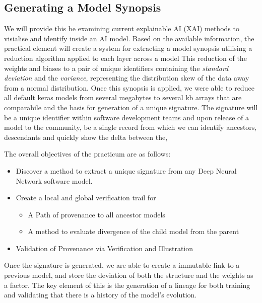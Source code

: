 \subsection{Generating a Model Synopsis}
We will provide this be examining current explainable AI (XAI) methods to visialise and identify inside an AI model. Based on the available information, the practical element will create a system for extracting a model synopsis utilising a reduction algorithm applied to each layer across a model This reduction of the weights and biases to a pair of unique identifiers containing the \textit{standard deviation} and the \textit{variance}, representing the distribution skew of the data away from a normal distribution. Once this synopsis is applied, we were able to reduce all default keras models from several megabytes to several kb arrays that are comparabile and the basis for generation of a unique signature. The signature will be a unique identifier within software development teams and upon release of a model to the community, be a single record from which we can identify ancestors, descendants and quickly show the delta between the,

The overall objectives of the practicum are as follows:

\begin{itemize}
    \item Discover a method to extract a unique signature from any Deep Neural Network software model.
    \item Create a local and global verification trail for
    \begin{itemize}
        \item A Path of provenance to all ancestor models
        \item A method to evaluate divergence of the child model from the parent
    \end{itemize}
    \item Validation of Provenance via Verification and Illustration
\end{itemize}

Once the signature is generated, we are able to create a immutable link to a previous model, and store the deviation of both the structure and the weights as a factor. The key element of this is the generation of a lineage for both training and validating that there is a history of the model's evolution.

